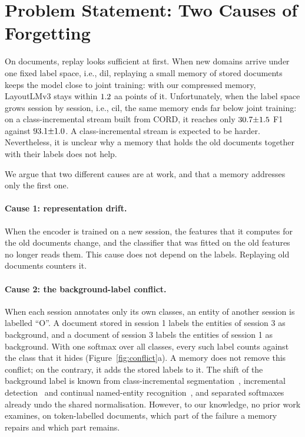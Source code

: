 \section{Problem Statement: Two Causes of Forgetting}
\label{sec:c1-s2}

On documents, replay looks sufficient at first. When new domains arrive under one fixed
label space, i.e., \gls{dil}, replaying a small memory of stored documents keeps the model
close to joint training: with our compressed memory, LayoutLMv3 stays within
$1.2$ \gls{aa} points of it. Unfortunately, when the label space grows session
by session, i.e., \gls{cil}, the same memory ends far below joint training: on a
class-incremental stream built from CORD, it reaches only $30.7{\pm}1.5$ F1 against
$93.1{\pm}1.0$. A class-incremental stream is expected to be harder. Nevertheless, it is
unclear why a memory that holds the old documents together with their labels does not help.

We argue that two different causes are at work, and that a memory addresses only the first
one.

\paragraph{Cause 1: representation drift.} When the encoder is trained on a new session,
the features that it computes for the old documents change, and the classifier that was
fitted on the old features no longer reads them. This cause does not depend on the labels.
Replaying old documents counters it.

\paragraph{Cause 2: the background-label conflict.} When each session annotates only its
own classes, an entity of another session is labelled ``O''. A document stored in session 1
labels the entities of session 3 as background, and a document of session 3 labels the
entities of session 1 as background. With one softmax over all classes, every such label
counts against the class that it hides (Figure~\ref{fig:conflict}a). A memory does not
remove this conflict; on the contrary, it adds the stored labels to it. The shift of the
background label is known from class-incremental
segmentation~\citep{cermelli2020mib,douillard2021plop}, incremental
detection~\citep{liu2023abr,mo2024bpf} and continual named-entity
recognition~\citep{monaikul2021extendner,zhang2023cpfd}, and separated
softmaxes~\citep{ahn2021ssil,kim2022more,liu2023ice} already undo the shared
normalisation. However, to our knowledge, no prior work examines, on token-labelled
documents, which part of the failure a memory repairs and which part remains.

